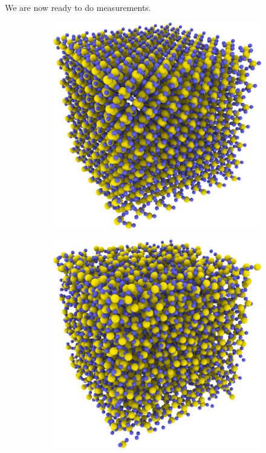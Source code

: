 We are now ready to do measurements.
%
\begin{figure}[htpb]%
    \centering%
    \begin{subfigure}[c]{0.45\textwidth}%
        \includegraphics[width=\textwidth]{images/melt_glass/perfect_crystal02_cropped}%
        \caption{%
            \label{fig:cristobalite01}%
        }%
    \end{subfigure}%
    \hspace{0.07\textwidth}%
    \begin{subfigure}[c]{0.45\textwidth}%
        \includegraphics[width=\textwidth]{images/melt_glass/melted02_cropped}%

\end{subfigure}
\end{figure}
